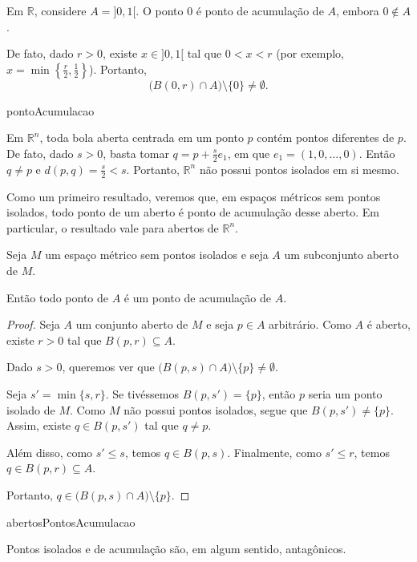 \begin{example}
    Em $\mathbb R$, considere $A=]0,1[$.
    O ponto $0$ é ponto de acumulação de $A$, embora $0\notin A$.

    De fato, dado $r>0$, existe $x\in]0,1[$ tal que $0<x<r$ (por exemplo, $x=\min\left\{\frac r2,\frac12\right\}$).
    Portanto,
    \[
        \bigl(B(0,r)\cap A\bigr)\setminus\{0\}\neq\emptyset.
    \]
\end{example}

{pontoAcumulacao}

Em $\mathbb R^n$, toda bola aberta centrada em um ponto $p$ contém pontos diferentes de $p$.
De fato, dado $s>0$, basta tomar $q=p+\frac{s}{2}e_1$, em que $e_1=(1,0,\dots,0)$.
Então $q\neq p$ e $d(p,q)=\frac{s}{2}<s$.
Portanto, $\mathbb R^n$ não possui pontos isolados em si mesmo.

Como um primeiro resultado, veremos que, em espaços métricos sem pontos isolados, todo ponto de um aberto é ponto de acumulação desse aberto.
Em particular, o resultado vale para abertos de $\mathbb R^n$.

\begin{proposition}\label{prop:abertosPontosAcumulacao}
    Seja $M$ um espaço métrico sem pontos isolados e seja $A$ um subconjunto aberto de $M$.

    Então todo ponto de $A$ é um ponto de acumulação de $A$.
\end{proposition}
\begin{proof}
    Seja $A$ um conjunto aberto de $M$ e seja $p \in A$ arbitrário.
    Como $A$ é aberto, existe $r>0$ tal que $B(p, r)\subseteq A$.

    Dado $s>0$, queremos ver que $\bigl(B(p, s)\cap A\bigr)\setminus\{p\}\neq \emptyset$.

    Seja $s'=\min\{s, r\}$.
    Se tivéssemos $B(p,s')=\{p\}$, então $p$ seria um ponto isolado de $M$.
    Como $M$ não possui pontos isolados, segue que $B(p,s')\neq\{p\}$.
    Assim, existe $q\in B(p,s')$ tal que $q\neq p$.

    Além disso, como $s'\leq s$, temos $q\in B(p,s)$.
    Finalmente, como $s'\leq r$, temos $q\in B(p,r)\subseteq A$.

    Portanto, $q\in \bigl(B(p, s)\cap A\bigr)\setminus\{p\}$.
\end{proof}

{abertosPontosAcumulacao}

Pontos isolados e de acumulação são, em algum sentido, antagônicos.

